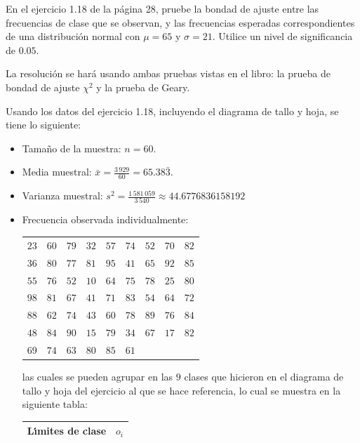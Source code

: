 \begin{enunciado}
 En el ejercicio 1.18 de la p\'agina 28, pruebe la bondad de ajuste
 entre las frecuencias de clase que se observan,
 y las frecuencias esperadas correspondientes de una distribuci\'on normal
 con $\mu = 65$ y $\sigma = 21$.
 Utilice un nivel de significancia de $0.05$.
\end{enunciado}

\begin{solucion}
 La resoluci\'on se har\'a usando ambas pruebas vistas en el libro:
 la prueba de bondad de ajuste $\chi^2$ y la prueba de Geary.
 \begin{datos}
  Usando los datos del ejercicio 1.18, incluyendo el diagrama de tallo y hoja, 
  se tiene lo siguiente:
  \begin{itemize}
   \item Tama\~no de la muestra: $n=60$.
   \item Media muestral: $\bar{x} = \frac{3\,929}{60} = 65.38\bar{3}$.
   \item Varianza muestral:
   $s^2 = \frac{1\,581\,059}{3\,540} \approx 44.6776836158192$
   \item Frecuencia observada individualmente:
   \begin{center}
    \begin{tabular}{ccccccccc}
     $23$ & $60$ & $79$ & $32$ & $57$ & $74$ & $52$ & $70$ & $82$ \\
     $36$ & $80$ & $77$ & $81$ & $95$ & $41$ & $65$ & $92$ & $85$ \\
     $55$ & $76$ & $52$ & $10$ & $64$ & $75$ & $78$ & $25$ & $80$ \\
     $98$ & $81$ & $67$ & $41$ & $71$ & $83$ & $54$ & $64$ & $72$ \\
     $88$ & $62$ & $74$ & $43$ & $60$ & $78$ & $89$ & $76$ & $84$ \\
     $48$ & $84$ & $90$ & $15$ & $79$ & $34$ & $67$ & $17$ & $82$ \\
     $69$ & $74$ & $63$ & $80$ & $85$ & $61$
    \end{tabular}
   \end{center}
   las cuales se pueden agrupar en las $9$ clases que hicieron
   en el diagrama de tallo y hoja del ejercicio al que se hace referencia, 
   lo cual se muestra en la siguiente tabla:
   \begin{center}
    \begin{tabular}{cc}
     \hline 
     \textbf{L\'{\i}mites de clase} & $o_i$ \\
     \hline 

\end{tabular}
\end{center}
\end{itemize}
\end{datos}
\end{solucion}
